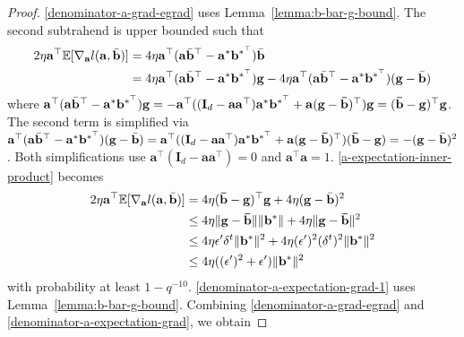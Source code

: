 \documentclass{article}
\theoremstyle{plain}
\theoremstyle{definition}
\theoremstyle{remark}
\begin{document}
\begin{proof}
\eqref{denominator-a-grad-egrad} uses Lemma~\ref{lemma:b-bar-g-bound}. The second subtrahend is upper bounded such that
\begin{align}
    2\eta  \mathbf{a}^\top  \mathbb{E}[\nabla_{\mathbf{a}}l(\mathbf{a},\Bar{\mathbf{b}})] & =  4\eta  \mathbf{a}^\top (\mathbf{a}\Bar{\mathbf{b}}^\top-\mathbf{a}^* \mathbf{b}^{*^\top}) \Bar{\mathbf{b}} \\
    & = 4\eta   \mathbf{a}^\top (\mathbf{a}\Bar{\mathbf{b}}^\top-\mathbf{a}^* \mathbf{b}^{*^\top}) \mathbf{g} - 4\eta  \mathbf{a}^\top (\mathbf{a}\Bar{\mathbf{b}}^\top-\mathbf{a}^* \mathbf{b}^{*^\top}) (\mathbf{g}-\Bar{\mathbf{b}} ) \label{a-expectation-inner-product}
\end{align}
where $\mathbf{a}^\top (\mathbf{a}\Bar{\mathbf{b}}^\top-\mathbf{a}^* \mathbf{b}^{*^\top}) \mathbf{g}=-\mathbf{a}^\top ((\mathbf{I}_d-\mathbf{a}\mathbf{a}^\top)\mathbf{a}^*\mathbf{b}^{*^\top}+\mathbf{a}(\mathbf{g}-\mathbf{\Bar{b}})^\top) \mathbf{g}=(\mathbf{\Bar{b}}-\mathbf{g})^\top \mathbf{g}$. The second term is simplified via $\mathbf{a}^\top (\mathbf{a}\Bar{\mathbf{b}}^\top-\mathbf{a}^* \mathbf{b}^{*^\top}) (\mathbf{g}-\Bar{\mathbf{b}} ) =\mathbf{a}^\top((\mathbf{I}_d-\mathbf{a}\mathbf{a}^\top)\mathbf{a}^*\mathbf{b}^{*^\top}+\mathbf{a}(\mathbf{g}-\mathbf{\Bar{b}})^\top) (\mathbf{\Bar{b}}-\mathbf{g}) = -(\mathbf{g}-\Bar{\mathbf{b}} )^2$. Both simplifications use $\mathbf{a}^\top(\mathbf{I}_d-\mathbf{a}\mathbf{a}^\top)=0$ and $\mathbf{a}^\top\mathbf{a}=1$. \eqref{a-expectation-inner-product} becomes 
\begin{align}
    2\eta  \mathbf{a}^\top  \mathbb{E}[\nabla_{\mathbf{a}}l(\mathbf{a},\Bar{\mathbf{b}})] &= 4\eta (\mathbf{\Bar{b}}-\mathbf{g})^\top \mathbf{g} + 4\eta (\mathbf{g}-\Bar{\mathbf{b}} )^2 \\
    &\leq 4\eta \lVert \mathbf{g}-\mathbf{\Bar{b}} \rVert \lVert \mathbf{b}^* \rVert +4 \eta \lVert \mathbf{g}-\mathbf{\Bar{b}} \rVert^2\\
    & \leq 4\eta \epsilon' \delta^t \lVert \mathbf{b}^*\rVert^2 + 4\eta (\epsilon')^2 (\delta^{t})^2 \lVert \mathbf{b}^*\rVert^2  \label{denominator-a-expectation-grad-1}\\
    &\leq 4\eta ((\epsilon')^2+\epsilon')\lVert \mathbf{b}^*\rVert^2 \label{denominator-a-expectation-grad}
\end{align}
with probability at least $1-q^{-10}$. \eqref{denominator-a-expectation-grad-1} uses Lemma~\ref{lemma:b-bar-g-bound}. Combining \eqref{denominator-a-grad-egrad} and \eqref{denominator-a-expectation-grad}, we obtain

\end{proof}
\end{document}
